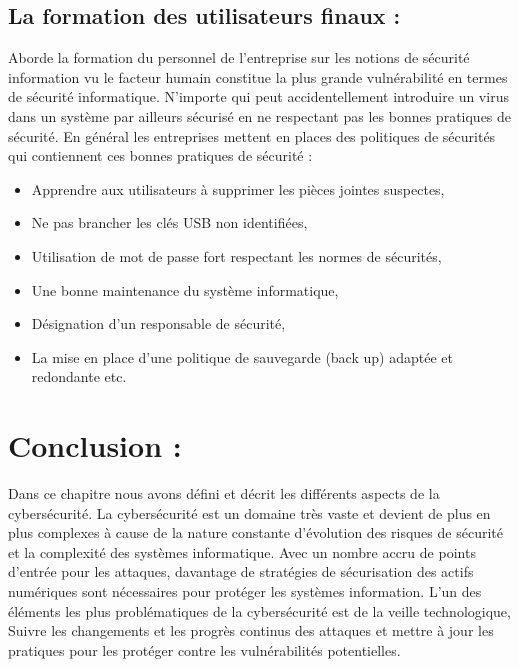 \subsection{La formation des utilisateurs finaux : }
Aborde la formation du personnel de l’entreprise sur les notions de sécurité information vu le facteur humain constitue la plus grande vulnérabilité en termes de sécurité informatique. N'importe qui peut accidentellement introduire un virus dans un système par ailleurs sécurisé en ne respectant pas les bonnes pratiques de sécurité. En général les entreprises mettent en places des politiques de sécurités qui contiennent ces bonnes pratiques de sécurité :
\begin{itemize}
\item Apprendre aux utilisateurs à supprimer les pièces jointes suspectes,
\item Ne pas brancher les clés USB non identifiées,
\item Utilisation de mot de passe fort respectant les normes de sécurités,
\item Une bonne maintenance du système informatique,
\item Désignation d’un responsable de sécurité,
\item La mise en place d’une politique de sauvegarde (back up) adaptée et redondante etc.
\end{itemize}
\section{Conclusion : }
Dans ce chapitre nous avons défini et décrit les différents aspects de la cybersécurité. La cybersécurité est un domaine très vaste et devient de plus en plus complexes à cause de la nature constante d’évolution des risques de sécurité et la complexité des systèmes informatique.
Avec un nombre accru de points d'entrée pour les attaques, davantage de stratégies de sécurisation des actifs numériques sont nécessaires pour protéger les systèmes information. L'un des éléments les plus problématiques de la cybersécurité est de la veille technologique, Suivre les changements et les progrès continus des attaques et mettre à jour les pratiques pour les protéger contre les vulnérabilités potentielles.
 








